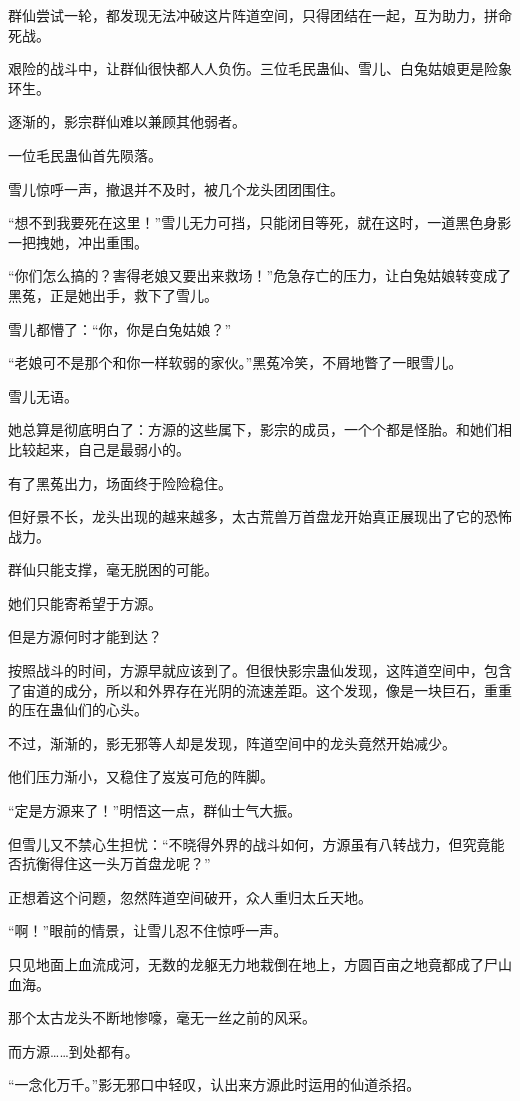 \begin{this_body}
群仙尝试一轮，都发现无法冲破这片阵道空间，只得团结在一起，互为助力，拼命死战。

艰险的战斗中，让群仙很快都人人负伤。三位毛民蛊仙、雪儿、白兔姑娘更是险象环生。

逐渐的，影宗群仙难以兼顾其他弱者。

一位毛民蛊仙首先陨落。

雪儿惊呼一声，撤退并不及时，被几个龙头团团围住。

“想不到我要死在这里！”雪儿无力可挡，只能闭目等死，就在这时，一道黑色身影一把拽她，冲出重围。

“你们怎么搞的？害得老娘又要出来救场！”危急存亡的压力，让白兔姑娘转变成了黑菟，正是她出手，救下了雪儿。

雪儿都懵了：“你，你是白兔姑娘？”

“老娘可不是那个和你一样软弱的家伙。”黑菟冷笑，不屑地瞥了一眼雪儿。

雪儿无语。

她总算是彻底明白了：方源的这些属下，影宗的成员，一个个都是怪胎。和她们相比较起来，自己是最弱小的。

有了黑菟出力，场面终于险险稳住。

但好景不长，龙头出现的越来越多，太古荒兽万首盘龙开始真正展现出了它的恐怖战力。

群仙只能支撑，毫无脱困的可能。

她们只能寄希望于方源。

但是方源何时才能到达？

按照战斗的时间，方源早就应该到了。但很快影宗蛊仙发现，这阵道空间中，包含了宙道的成分，所以和外界存在光阴的流速差距。这个发现，像是一块巨石，重重的压在蛊仙们的心头。

不过，渐渐的，影无邪等人却是发现，阵道空间中的龙头竟然开始减少。

他们压力渐小，又稳住了岌岌可危的阵脚。

“定是方源来了！”明悟这一点，群仙士气大振。

但雪儿又不禁心生担忧：“不晓得外界的战斗如何，方源虽有八转战力，但究竟能否抗衡得住这一头万首盘龙呢？”

正想着这个问题，忽然阵道空间破开，众人重归太丘天地。

“啊！”眼前的情景，让雪儿忍不住惊呼一声。

只见地面上血流成河，无数的龙躯无力地栽倒在地上，方圆百亩之地竟都成了尸山血海。

那个太古龙头不断地惨嚎，毫无一丝之前的风采。

而方源……到处都有。

“一念化万千。”影无邪口中轻叹，认出来方源此时运用的仙道杀招。


\end{this_body}

